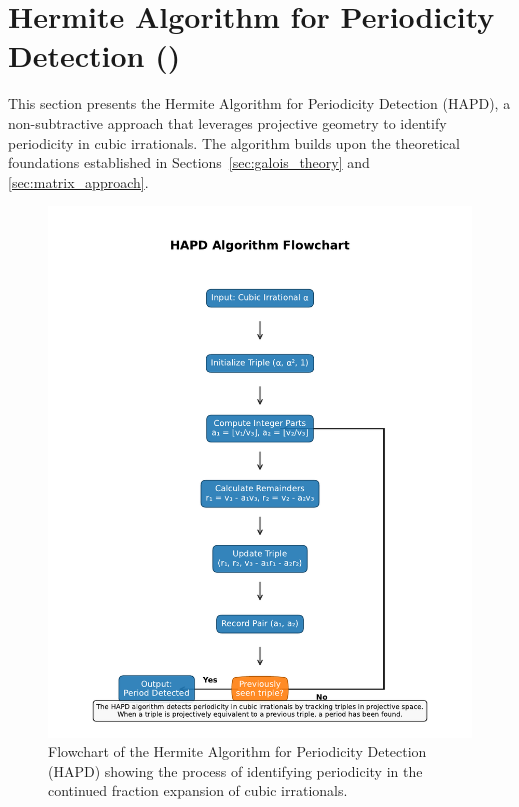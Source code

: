 \section{Hermite Algorithm for Periodicity Detection (\HAPD)}\label{sec:hapd_algorithm}

This section presents the Hermite Algorithm for Periodicity Detection (HAPD), a non-subtractive approach that leverages projective geometry to identify periodicity in cubic irrationals. The algorithm builds upon the theoretical foundations established in Sections~\ref{sec:galois_theory} and \ref{sec:matrix_approach}.

\begin{figure}[htbp]
\begin{minipage}{\textwidth}
\centering
\includegraphics[width=\textwidth]{figures/output/hapd_algorithm_flowchart.pdf}
\caption{Flowchart of the Hermite Algorithm for Periodicity Detection (HAPD) showing the process of identifying periodicity in the continued fraction expansion of cubic irrationals.}
\label{fig:hapd_flowchart}
\end{minipage}
\end{figure}

